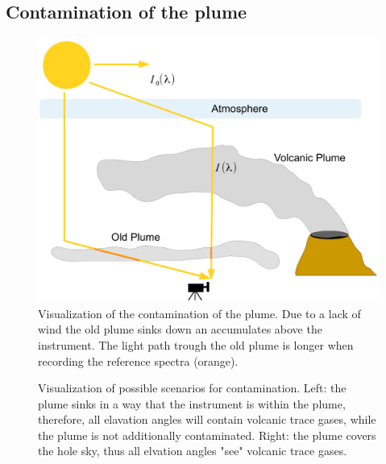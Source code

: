 \documentclass  [
  paper    = a4,
  BCOR     = 10mm,
  twoside,
  fontsize = 12pt,
  fleqn,
  toc      = bibnumbered,
  toc      = listofnumbered,
  numbers  = noendperiod,
  headings = normal,
  listof   = leveldown,
  version  = 3.03
]                                       {scrreprt}
\begin{document}
	\subsection{Contamination of the plume}
	\begin{figure}
		\centering
		\includegraphics[width=0.7\linewidth]{Bilder/Contaminationplume}
		\caption{Visualization of the contamination of the plume. Due to a lack of wind the old plume sinks down an accumulates
		above the instrument. The light path trough the old plume is longer when recording the reference spectra (orange).}
		\label{fig:contaminationplume}
	\end{figure}
		\begin{figure}
			\centering
			\caption{Visualization of possible scenarios for contamination. Left: the plume sinks in a way that the instrument is within the plume, therefore, all elavation angles will contain volcanic trace gases, while the plume is not additionally contaminated. Right: the plume covers the hole sky, thus all elvation angles "see" volcanic trace gases. }
			\label{fig:contaminationplumewideplume}
		\end{figure}
\end{document}
